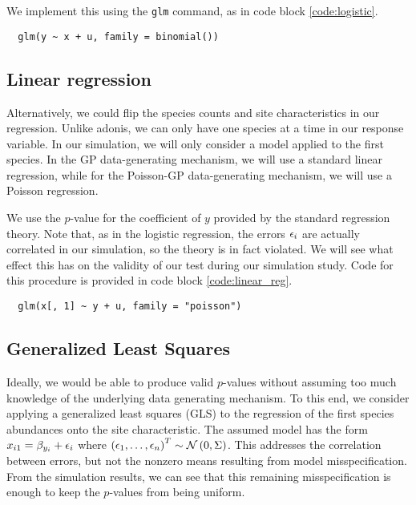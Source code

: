\documentclass{article}
\newenvironment{code}{\captionsetup{type=listing}}{}
\begin{document}
We implement this using the \texttt{glm} command, as in code block
\ref{code:logistic}.

\begin{code}
\begin{verbatim}
  glm(y ~ x + u, family = binomial())
\end{verbatim}
\label{code:logistic}
\end{code}

\subsection{Linear regression}
\label{subsec:linear_regression}

Alternatively, we could flip the species counts and site characteristics in our
regression. Unlike adonis, we can only have one species at a time in our
response variable. In our simulation, we will only consider a model applied to
the first species. In the GP data-generating mechanism, we will use a standard
linear regression, while for the Poisson-GP data-generating mechanism, we will
use a Poisson regression.

We use the $p$-value for the coefficient of $y$ provided by the standard
regression theory. Note that, as in the logistic regression, the errors
$\epsilon_{i}$ are actually correlated in our simulation, so the theory is in fact
violated. We will see what effect this has on the validity of our test during
our simulation study. Code for this procedure is provided in code block
\ref{code:linear_reg}.

\begin{code}
\begin{verbatim}
  glm(x[, 1] ~ y + u, family = "poisson")
\end{verbatim}
\label{code:linear_reg}
\end{code}

\subsection{Generalized Least Squares}
\label{subsec:generalized_least_squares}

Ideally, we would be able to produce valid $p$-values without assuming too much
knowledge of the underlying data generating mechanism. To this end, we consider
applying a generalized least squares (GLS) to the regression of the first
species abundances onto the site characteristic. The assumed model has the form
$x_{i1} = \beta_{y_{i}} + \epsilon_{i}$ where
$\left(\epsilon_{1}, \dots, \epsilon_{n}\right)^{T} \sim \mathcal{N}\left(0, \Sigma\right)$.
This addresses the correlation between errors, but not the nonzero means
resulting from model misspecification. From the simulation results, we can see
that this remaining misspecification is enough to keep the $p$-values from being
uniform.
\end{document}

